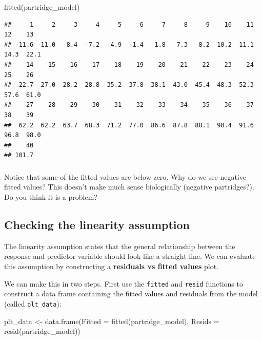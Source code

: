 \documentclass[
]{book}
\newenvironment{Shaded}{\begin{snugshade}}{\end{snugshade}}
\newcommand{\AttributeTok}[1]{\textcolor[rgb]{0.77,0.63,0.00}{#1}}
\newcommand{\FunctionTok}[1]{\textcolor[rgb]{0.00,0.00,0.00}{#1}}
\newcommand{\NormalTok}[1]{#1}
\newcommand{\OtherTok}[1]{\textcolor[rgb]{0.56,0.35,0.01}{#1}}
\newenvironment{greybox}{
  \definecolor{shadecolor}{rgb}{0.95,0.95,0.95}  %
  \color{black}
  \begin{shaded}}
 {\end{shaded}}
\newenvironment{infobox}[1]
  {
  \begin{itemize}
  \renewcommand{\labelitemi}{
    \raisebox{-.7\height}[0pt][0pt]{
      {\setkeys{Gin}{width=3em,keepaspectratio}
        \texttt{[image: images/\#1]}}
    }
  }
  \setlength{\fboxsep}{1em}
  \begin{greybox}
  \item
  }
  {
  \end{greybox}
  \end{itemize}
  }
\begin{document}
\begin{Shaded}
\begin{Highlighting}[]
\FunctionTok{fitted}\NormalTok{(partridge\_model)}
\end{Highlighting}
\end{Shaded}

\begin{verbatim}
##     1     2     3     4     5     6     7     8     9    10    11    12    13 
## -11.6 -11.0  -8.4  -7.2  -4.9  -1.4   1.8   7.3   8.2  10.2  11.1  14.3  22.1 
##    14    15    16    17    18    19    20    21    22    23    24    25    26 
##  22.7  27.0  28.2  28.8  35.2  37.8  38.1  43.0  45.4  48.3  52.3  57.6  61.0 
##    27    28    29    30    31    32    33    34    35    36    37    38    39 
##  62.2  62.2  63.7  68.3  71.2  77.0  86.6  87.8  88.1  90.4  91.6  96.8  98.0 
##    40 
## 101.7
\end{verbatim}

\begin{infobox}{action}

\hypertarget{section-14}{%
\subsubsection*{}\label{section-14}}

Notice that some of the fitted values are below zero. Why do we see negative fitted values? This doesn't make much sense biologically (negative partridges?). Do you think it is a problem?

\end{infobox}

\hypertarget{checking-the-linearity-assumption}{%
\subsection{Checking the linearity assumption}\label{checking-the-linearity-assumption}}

The linearity assumption states that the general relationship between the response and predictor variable should look like a straight line. We can evaluate this assumption by constructing a \textbf{residuals vs fitted values} plot.

We can make this in two steps. First use the \texttt{fitted} and \texttt{resid} functions to construct a data frame containing the fitted values and residuals from the model (called \texttt{plt\_data}):

\begin{Shaded}
\begin{Highlighting}[]
\NormalTok{plt\_data }\OtherTok{\textless{}{-}} 
  \FunctionTok{data.frame}\NormalTok{(}\AttributeTok{Fitted =} \FunctionTok{fitted}\NormalTok{(partridge\_model), }
             \AttributeTok{Resids =}  \FunctionTok{resid}\NormalTok{(partridge\_model))}
\end{Highlighting}
\end{Shaded}
\end{document}
